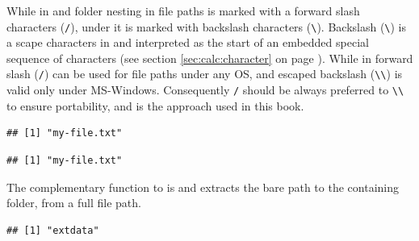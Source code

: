 \documentclass[krantz2]{krantz}\usepackage{knitr}%
\begin{document}
\begin{warningbox}
While in  and  folder nesting in file paths is marked with a forward slash characters (\verb|/|), under  it is marked with backslash characters (\verb|\|). Backslash (\verb|\|) is a scape characters in \Rlang and interpreted as the start of an embedded special sequence of characters (see section \ref{sec:calc:character} on page \pageref{sec:calc:character}). While in \Rlang forward slash (\verb|/|) can be used for file paths under any OS, and escaped backslash (\verb|\\|) is valid only under MS-Windows. Consequently \verb|/| should be always preferred to \verb|\\| to ensure portability, and is the approach used in this book.

\begin{knitrout}\footnotesize
{}\color{fgcolor}\begin{kframe}
\begin{alltt}
\hlstd{(}\hlstd{)}
\end{alltt}
\begin{verbatim}
## [1] "my-file.txt"
\end{verbatim}
\begin{alltt}
\hlstd{(}\hlstd{)}
\end{alltt}
\begin{verbatim}
## [1] "my-file.txt"
\end{verbatim}
\end{kframe}
\end{knitrout}
\end{warningbox}

The complementary function to  is  and extracts the bare path to the containing folder, from a full file path.

\begin{knitrout}\footnotesize
{}\color{fgcolor}\begin{kframe}
\begin{alltt}
\hlstd{(}\hlstd{)}
\end{alltt}
\begin{verbatim}
## [1] "extdata"
\end{verbatim}
\end{kframe}
\end{knitrout}
\end{document}
